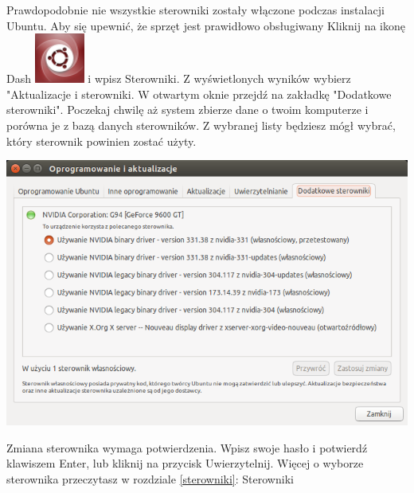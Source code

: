 Prawdopodobnie nie wszystkie sterowniki zostały włączone podczas instalacji Ubuntu. Aby się upewnić, że sprzęt jest prawidłowo obsługiwany Kliknij na ikonę Dash \includegraphics[scale=0.35]{images/ikony_dash.png} i wpisz \textcolor{ubuntu_orange}{Sterowniki}. Z wyświetlonych wyników wybierz "Aktualizacje i sterowniki. W otwartym oknie przejdź na zakładkę "Dodatkowe sterowniki". Poczekaj chwilę aż system zbierze dane o twoim komputerze i porówna je z bazą danych sterowników. Z wybranej listy będziesz mógł wybrać, który sterownik powinien zostać użyty.
\begin{center}
        \includegraphics[width=\linewidth]{images/pierwsze_uruchomienie_driver2.png}
\end{center}

Zmiana sterownika wymaga potwierdzenia. Wpisz swoje hasło i potwierdź klawiszem Enter, lub kliknij na przycisk \textcolor{ubuntu_orange}{Uwierzytelnij}. Więcej o wyborze sterownika przeczytasz w rozdziale \ref{sterowniki}: Sterowniki

